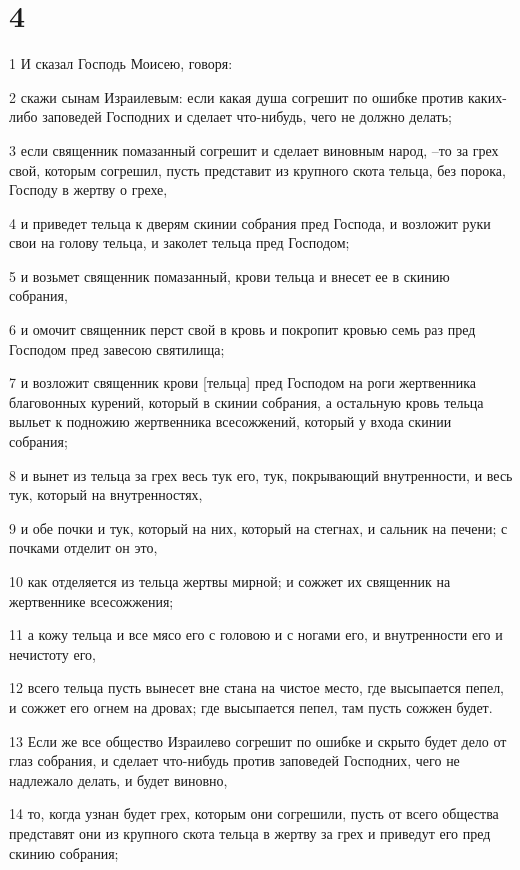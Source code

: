 \chapter{4}

\par 1 И сказал Господь Моисею, говоря:
\par 2 скажи сынам Израилевым: если какая душа согрешит по ошибке против каких-либо заповедей Господних и сделает что-нибудь, чего не должно делать;
\par 3 если священник помазанный согрешит и сделает виновным народ, --то за грех свой, которым согрешил, пусть представит из крупного скота тельца, без порока, Господу в жертву о грехе,
\par 4 и приведет тельца к дверям скинии собрания пред Господа, и возложит руки свои на голову тельца, и заколет тельца пред Господом;
\par 5 и возьмет священник помазанный, крови тельца и внесет ее в скинию собрания,
\par 6 и омочит священник перст свой в кровь и покропит кровью семь раз пред Господом пред завесою святилища;
\par 7 и возложит священник крови [тельца] пред Господом на роги жертвенника благовонных курений, который в скинии собрания, а остальную кровь тельца выльет к подножию жертвенника всесожжений, который у входа скинии собрания;
\par 8 и вынет из тельца за грех весь тук его, тук, покрывающий внутренности, и весь тук, который на внутренностях,
\par 9 и обе почки и тук, который на них, который на стегнах, и сальник на печени; с почками отделит он это,
\par 10 как отделяется из тельца жертвы мирной; и сожжет их священник на жертвеннике всесожжения;
\par 11 а кожу тельца и все мясо его с головою и с ногами его, и внутренности его и нечистоту его,
\par 12 всего тельца пусть вынесет вне стана на чистое место, где высыпается пепел, и сожжет его огнем на дровах; где высыпается пепел, там пусть сожжен будет.
\par 13 Если же все общество Израилево согрешит по ошибке и скрыто будет дело от глаз собрания, и сделает что-нибудь против заповедей Господних, чего не надлежало делать, и будет виновно,
\par 14 то, когда узнан будет грех, которым они согрешили, пусть от всего общества представят они из крупного скота тельца в жертву за грех и приведут его пред скинию собрания;
